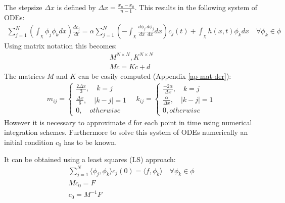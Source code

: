 The stepsize \(\Delta x\) is defined by \(\Delta x = \frac{x_n - x_0}{n-1}\). \label{def-delta-x}
This results in the following system of ODEs:
\begin{gather}
\sum_{j=1}^N(\int_{\chi} \phi_{j}\phi_{k}dx)\frac{dc_{j}}{dt} = \alpha \sum_{j = 1}^N(-\int_{\chi} \frac{d\phi_{j}}{dx}\frac{d\phi_{j}}{dx}dx)c_{j}(t) + \int_{\chi}h(x, t) \phi_{k} dx
\quad \forall \phi_{k} \in \phi \label{eq-heat-fem}
\end{gather}
Using matrix notation this becomes:
\begin{gather}
M^{N \times N}, K^{N \times N} \\
M\dot{c} = Kc + d \label{eq-heat-almost-ss}
\end{gather}
The matrices \(M\) and \(K\) can be easily computed (Appendix \ref{ap-mat-der}):
\begin{gather}
m_{ij} = \begin{cases}
\frac{2\Delta x}{3}, \quad k = j \\
\frac{\Delta x}{6}, \quad |k - j| = 1 \\
0, \quad otherwise 
\end{cases} \label{def-mat-a}
\quad
k_{ij} = \begin{cases}
\frac{-2\alpha}{\Delta x}, \quad k = j \\
\frac{\alpha}{\Delta x}, \quad |k - j| = 1 \\
0, otherwise
\end{cases}
\end{gather}
However it is necessary to approximate \(d\) for each point in time using numerical integration schemes.
Furthermore to solve this system of ODEs numerically an initial condition \(c_{0}\) has to be known.
\cite{Gustafsson2011b}


It can be obtained using a least squares (LS) approach:
\begin{gather}
\sum_{j = 1}^N \langle \phi_j, \phi_k \rangle c_{j}(0) = \langle f, \phi_{k} \rangle \quad \forall \phi_k \in \phi \\
Mc_{0} = F \\
c_{0} = M^{-1}F
\end{gather}
\cite{Gustafsson2011c}

